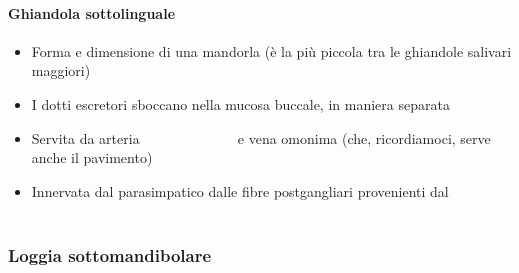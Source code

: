 \documentclass[italian,]{article}
\providecommand{\tightlist}{%
  \setlength{\itemsep}{0pt}\setlength{\parskip}{0pt}}
\newcommand{\art}[1]{\colorbox{RedOrange}{\textcolor{white}{\textsc{#1}}}}
\newcommand{\ner}[1]{\colorbox{Dandelion}{\textcolor{white}{\textsc{#1}}}}
\begin{document}
\hypertarget{ghiandola-sottolinguale}{%
\paragraph{Ghiandola sottolinguale}\label{ghiandola-sottolinguale}}

\begin{itemize}
\tightlist
\item
  Forma e dimensione di una mandorla (è la più piccola tra le ghiandole
  salivari maggiori)
\item
  I dotti escretori sboccano nella mucosa buccale, in maniera separata
\item
  Servita da arteria \art{sottolinguale} e vena omonima (che,
  ricordiamoci, serve anche il pavimento)
\item
  Innervata dal parasimpatico dalle fibre postgangliari provenienti dal
  \ner{ganglio sottomandibolare}
\end{itemize}

\hypertarget{loggia-sottomandibolare}{%
\subsubsection{Loggia sottomandibolare}\label{loggia-sottomandibolare}}
\end{document}
